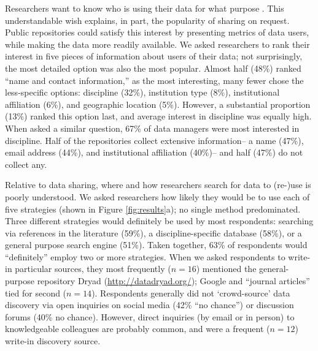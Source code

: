 \documentclass[english]{article}
\begin{document}

Researchers want to know who is using their data for what purpose \cite{tenopir_data_2011, bobrow_establishing_2014}.
This understandable wish explains, in part, the popularity of sharing on request.
Public repositories could satisfy this interest by presenting metrics of data users, while making the data more readily available.
We asked researchers to rank their interest in five pieces of information about users of their data; not surprisingly, the most detailed option was also the most popular.
Almost half (48\%) ranked ``name and contact information,''  as the most interesting, many fewer chose the less-specific options: discipline (32\%), institution type (8\%), institutional affiliation (6\%), and geographic location (5\%).
However, a substantial proportion (13\%) ranked this option last, and average interest in discipline was equally high.
When asked a similar question, 67\% of data managers were most interested in discipline.
Half of the repositories collect extensive information-- a name (47\%), email address (44\%), and institutional affiliation (40\%)-- and half (47\%) do not collect any.



Relative to data sharing, where and how researchers search for data to (re-)use is poorly understood.
We asked researchers how likely they would be to use each of five strategies (shown in Figure \ref{fig:results}a); no single method predominated.
Three different strategies would definitely be used by most respondents: searching via references in the literature (59\%), a discipline-specific database (58\%), or a general purpose search engine (51\%). 
Taken together, 63\% of respondents would ``definitely'' employ two or more strategies.
When we asked respondents to write-in particular sources, they most frequently ($n=16$) mentioned the general-purpose repository Dryad (\url{http://datadryad.org/}); Google and ``journal articles'' tied for second ($n=14$). 
Respondents generally did not `crowd-source' data discovery via open inquiries on social media (42\% ``no chance'') or discussion forums (40\% no chance).
However, direct inquiries (by email or in person) to knowledgeable colleagues are probably common, and were a frequent ($n=12$) write-in discovery source.
\end{document}
